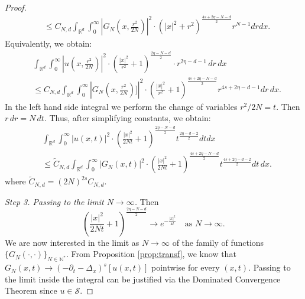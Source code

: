 \documentclass[11pt, twoside, notitlepage]{amsart}
\newcommand\R{\mathbb{R}}
\numberwithin{equation}{section}
\begin{document}
\begin{proof}
\begin{align*}
&\le
C_{N,d} \int_{\R^{d}}\int_0^\infty  \left| G_N(x,\frac{r^2}{2N}  )  \right|^2  \cdot(|x|^2+r^2)^{\frac{ 4s +2\eta - N-d}{2}} r^{N-1} dr dx.
\end{align*}
Equivalently, we obtain:
\begin{align*}
&\int_{\R^{d}}\int_0^\infty \left| u(x,\frac{r^2}{2N} ) \right|^2 \cdot \left( \frac{|x|^2}{r^2}+1 \right)^{\frac{{2\eta - N-d}}{2}} \cdot  r^{ 2\eta-d -1} \,dr \, dx \\
&\le C_{N,d} \int_{\R^{d}}\int_0^\infty  \left| G_N(x,\frac{r^2}{2N}  ) \big] \right|^2  \cdot\left(\frac{|x|^2}{r^2}+1 \right)^{\frac{ 4s +2\eta - N-d}{2}} r^{4s +2\eta -d-1} dr \, dx.
\end{align*}
In the left hand side integral we perform the change of variables $r^2/2N =t$. Then $r \, dr =N  \, dt$. Thus,
 after simplifying constants, we obtain:
\begin{align}\label{ineqN}
&\int_{\R^{d}}\int_0^\infty |u(x,t )|^2 \cdot \left( \frac{|x|^2}{2 N t}+1 \right)^{\frac{{2\eta - N-d}}{2}}    t^{\frac{  2\eta-d -2 }{2}}  dt dx \\
&\le \widetilde{C}_{N,d}  \int_{\R^{d}}\int_0^\infty  \left| G_N(x,t  )  \right|^2  \cdot \left(\frac{|x|^2}{2N t}+1 \right)^{\frac{ 4s +2\eta - N-d}{2}}  t^{\frac{ 4s +2\eta -d-2}{2}} dt \, dx. \nonumber
\end{align}
where $\widetilde{C}_{N,d}= (2N )^{2s} C_{N,d}$.

\noindent\emph{Step 3. Passing to the limit $N\to \infty$.} Then
$$
 \left( \frac{|x|^2}{2 N t}+1  \right)^{\frac{{2\eta - N-d}}{2}}  \to e ^{-\frac{|x|^2}{4t}} \quad \text{as }  N \to \infty.
 $$
We are now interested in the limit as $N \to \infty$ of the family  of functions $\{G_N(\cdot,\cdot)\}_{N\in \mathbb{N}^*}$.
From Proposition \ref{prop:transf}, we know that
$G_N(x, t) \rightarrow (-\partial_t-\Delta_x)^s [u(x,t)]$ pointwise for every $(x,t)$.
 Passing to the limit inside the integral can be justified via the Dominated Convergence Theorem since $u \in \mathcal{S}$.



\end{proof}
\end{document}

